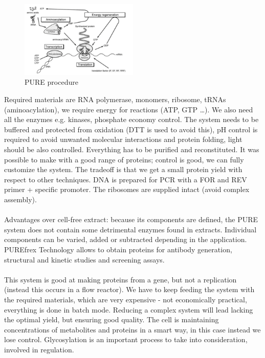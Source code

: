 \begin{figure}
\includegraphics[width=0.5\textwidth, center ]{pure}
\caption{\label{fig:pure} PURE procedure}
\end{figure}
\noindent
Required materials are RNA polymerase, monomers, ribosome, tRNAs (aminoacylation), we require energy for reactions (ATP, GTP …). 
We also need all the enzymes e.g. kinases, phosphate economy control. 
The system needs to be buffered and protected from oxidation (DTT is used to avoid this), pH control is required to avoid unwanted molecular interactions and protein folding, light should be also controlled. Everything has to be purified and reconstituted. 
It was possible to make with a good range of proteins; control is good, we can fully customize the system. The tradeoff is that we get a small protein yield with respect to other techniques. 
DNA is prepared for PCR with a FOR and REV primer + specific promoter. The ribosomes are supplied intact (avoid complex assembly).
\\
\\
\noindent
Advantages over cell-free extract: because its components are defined, the PURE system does not contain some detrimental enzymes found in extracts. Individual components can be varied, added or subtracted depending in the application.  PUREfrex Technology allows to obtain proteins for antibody generation, structural and kinetic studies and screening assays.
\\
\\
\noindent
This system is good at making proteins from a gene, but not a replication (instead this occurs in a flow reactor). We have to keep feeding the system with the required materials, which are very expensive - not economically practical, everything is done in batch mode.
Reducing a complex system will lead lacking the optimal yield, but ensuring good quality. The cell is maintaining concentrations of metabolites and proteins in a smart way, in this case instead we lose  control. Glycosylation is an important process to take into consideration, involved in regulation.

